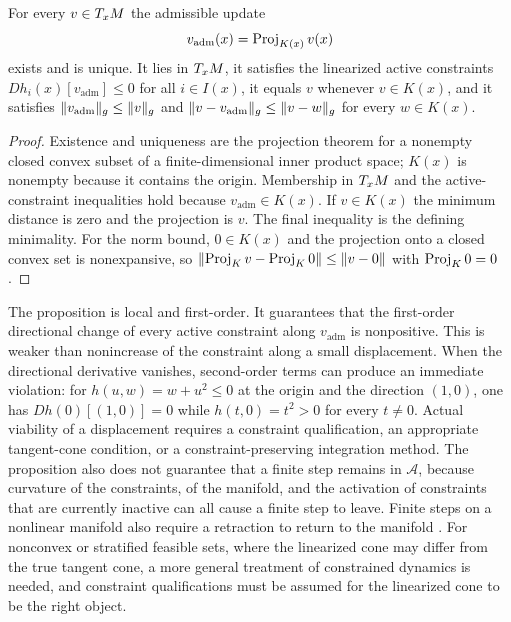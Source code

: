 \begin{proposition}\label{prop:adm-proj}
For every $v\in T_xM$ the admissible update
\[
v_{\mathrm{adm}}(x)=\operatorname{Proj}_{K(x)}v(x)
\]
exists and is unique. It lies in $T_xM$, it satisfies the linearized active constraints $Dh_i(x)[v_{\mathrm{adm}}]\le0$ for all $i\in I(x)$, it equals $v$ whenever $v\in K(x)$, and it satisfies $\lVert v_{\mathrm{adm}}\rVert_g\le\lVert v\rVert_g$ and $\lVert v-v_{\mathrm{adm}}\rVert_g\le\lVert v-w\rVert_g$ for every $w\in K(x)$.
\end{proposition}

\begin{proof}
Existence and uniqueness are the projection theorem for a nonempty closed convex subset of a finite-dimensional inner product space; $K(x)$ is nonempty because it contains the origin. Membership in $T_xM$ and the active-constraint inequalities hold because $v_{\mathrm{adm}}\in K(x)$. If $v\in K(x)$ the minimum distance is zero and the projection is $v$. The final inequality is the defining minimality. For the norm bound, $0\in K(x)$ and the projection onto a closed convex set is nonexpansive, so $\lVert \operatorname{Proj}_{K}v-\operatorname{Proj}_K0\rVert\le\lVert v-0\rVert$ with $\operatorname{Proj}_K0=0$.
\end{proof}

\begin{remark}
The proposition is local and first-order. It guarantees that the first-order directional change of every active constraint along $v_{\mathrm{adm}}$ is nonpositive. This is weaker than nonincrease of the constraint along a small displacement. When the directional derivative vanishes, second-order terms can produce an immediate violation: for $h(u,w)=w+u^2\le0$ at the origin and the direction $(1,0)$, one has $Dh(0)[(1,0)]=0$ while $h(t,0)=t^2>0$ for every $t\neq0$. Actual viability of a displacement requires a constraint qualification, an appropriate tangent-cone condition, or a constraint-preserving integration method. The proposition also does not guarantee that a finite step remains in $\mathcal A$, because curvature of the constraints, of the manifold, and the activation of constraints that are currently inactive can all cause a finite step to leave. Finite steps on a nonlinear manifold also require a retraction to return to the manifold \cite{absil2008}. For nonconvex or stratified feasible sets, where the linearized cone may differ from the true tangent cone, a more general treatment of constrained dynamics is needed, and constraint qualifications must be assumed for the linearized cone to be the right object.
\end{remark}

